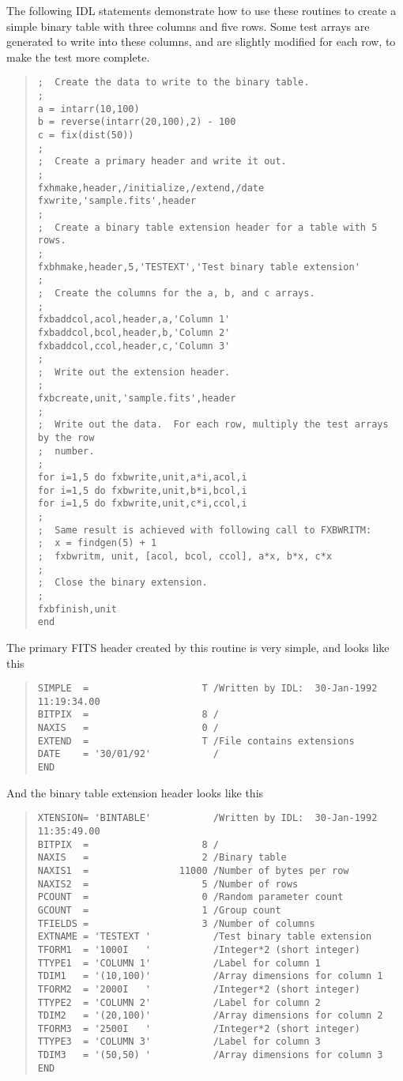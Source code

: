 The following IDL statements demonstrate how to use these routines to create a
simple binary table with three columns and five rows.  Some test arrays are
generated to write into these columns, and are slightly modified for each row,
to make the test more complete.
%
\begin{quote}
\begin{verbatim}
;  Create the data to write to the binary table.
;
a = intarr(10,100)
b = reverse(intarr(20,100),2) - 100
c = fix(dist(50))
;
;  Create a primary header and write it out.
;
fxhmake,header,/initialize,/extend,/date
fxwrite,'sample.fits',header
;
;  Create a binary table extension header for a table with 5 rows.
;
fxbhmake,header,5,'TESTEXT','Test binary table extension'
;
;  Create the columns for the a, b, and c arrays.
;
fxbaddcol,acol,header,a,'Column 1'
fxbaddcol,bcol,header,b,'Column 2'
fxbaddcol,ccol,header,c,'Column 3'
;
;  Write out the extension header.
;
fxbcreate,unit,'sample.fits',header
;
;  Write out the data.  For each row, multiply the test arrays by the row
;  number.
;
for i=1,5 do fxbwrite,unit,a*i,acol,i
for i=1,5 do fxbwrite,unit,b*i,bcol,i
for i=1,5 do fxbwrite,unit,c*i,ccol,i
;
;  Same result is achieved with following call to FXBWRITM:
;  x = findgen(5) + 1
;  fxbwritm, unit, [acol, bcol, ccol], a*x, b*x, c*x
;
;  Close the binary extension.
;
fxbfinish,unit
end
\end{verbatim}
\end{quote}
%
The primary FITS header created by this routine is very simple, and looks like
this
%
\begin{quote}
\begin{verbatim}
SIMPLE  =                    T /Written by IDL:  30-Jan-1992 11:19:34.00
BITPIX  =                    8 /
NAXIS   =                    0 /
EXTEND  =                    T /File contains extensions
DATE    = '30/01/92'           /
END
\end{verbatim}
\end{quote}
%
And the binary table extension header looks like this
%
\begin{quote}
\begin{verbatim}
XTENSION= 'BINTABLE'           /Written by IDL:  30-Jan-1992 11:35:49.00
BITPIX  =                    8 /
NAXIS   =                    2 /Binary table
NAXIS1  =                11000 /Number of bytes per row
NAXIS2  =                    5 /Number of rows
PCOUNT  =                    0 /Random parameter count
GCOUNT  =                    1 /Group count
TFIELDS =                    3 /Number of columns
EXTNAME = 'TESTEXT '           /Test binary table extension
TFORM1  = '1000I   '           /Integer*2 (short integer)
TTYPE1  = 'COLUMN 1'           /Label for column 1
TDIM1   = '(10,100)'           /Array dimensions for column 1
TFORM2  = '2000I   '           /Integer*2 (short integer)
TTYPE2  = 'COLUMN 2'           /Label for column 2
TDIM2   = '(20,100)'           /Array dimensions for column 2
TFORM3  = '2500I   '           /Integer*2 (short integer)
TTYPE3  = 'COLUMN 3'           /Label for column 3
TDIM3   = '(50,50) '           /Array dimensions for column 3
END
\end{verbatim}
\end{quote}


